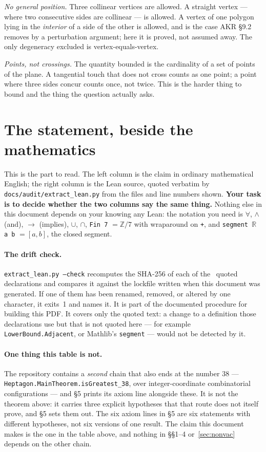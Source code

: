 \documentclass[11pt]{article}
\newcommand{\code}[1]{\texttt{\small #1}}
\begin{document}
\emph{No general position.} Three collinear vertices are allowed. A straight
vertex --- where two consecutive sides are collinear --- is allowed. A vertex of
one polygon lying in the \emph{interior} of a side of the other is allowed, and
is the case AKR \S9.2 removes by a perturbation argument; here it is proved,
not assumed away. The only degeneracy excluded is vertex-equals-vertex.

\emph{Points, not crossings.} The quantity bounded is the cardinality of a set
of points of the plane. A tangential touch that does not cross counts as one
point; a point where three sides concur counts once, not twice. This is the
harder thing to bound and the thing the question actually asks.

\section{The statement, beside the mathematics}

This is the part to read. The left column is the claim in ordinary
mathematical English; the right column is the Lean source, quoted verbatim by
\code{docs/audit/extract\_lean.py} from the files and line numbers shown.
\textbf{Your task is to decide whether the two columns say the same thing.}
Nothing else in this document depends on your knowing any Lean: the notation
you need is $\forall$, $\wedge$ (and), $\to$ (implies), $\cup$, $\cap$,
\code{Fin 7} $=\mathbb{Z}/7$ with wraparound on \code{+}, and
\code{segment $\mathbb{R}$ a b} $=[a,b]$, the closed segment.



\paragraph{The drift check.} \code{extract\_lean.py --check} recomputes the
SHA-256 of each of the \ndecls\ quoted declarations and compares it against the
lockfile written when this document was generated. If one of them has been
renamed, removed, or altered by one character, it exits~1 and names it. It is
part of the documented procedure for building this PDF. It covers only the
quoted text: a change to a definition those declarations use but that is not
quoted here --- for example \code{LowerBound.Adjacent}, or Mathlib's
\code{segment} --- would not be detected by it.

\paragraph{One thing this table is not.} The repository contains a
\emph{second} chain that also ends at the number $38$ ---
\code{Heptagon.MainTheorem.isGreatest\_38}, over integer-coordinate
combinatorial configurations --- and \S5 prints its axiom line alongside these.
It is not the theorem above: it carries three explicit hypotheses that that
route does not itself prove, and \S5 sets them out. The six axiom lines in
\S5 are six statements with different hypotheses, not six versions of one
result. The claim this document makes is the one in the table above, and nothing in \S\S1--4 or~\ref{sec:nonvac} depends on the other chain.
\end{document}
